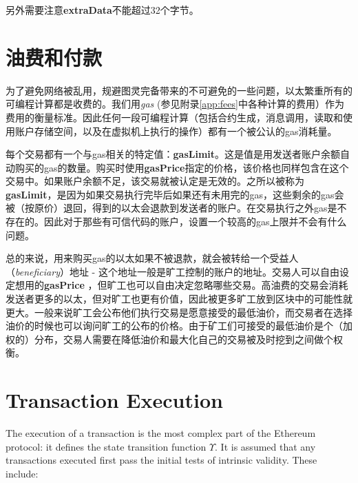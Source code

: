 \documentclass[UTF8,nofonts]{ctexart}
\begin{document}
\begin{multicols}{2}
另外需要注意\textbf{extraData}不能超过32个字节。

\section{油费和付款} \label{ch:payment}

为了避免网络被乱用，规避图灵完备带来的不可避免的一些问题，以太繁重所有的可编程计算都是收费的。我们用\textit{gas} (参见附录\ref{app:fees}中各种计算的费用）作为费用的衡量标准。因此任何一段可编程计算（包括合约生成，消息调用，读取和使用账户存储空间，以及在虚拟机上执行的操作）都有一个被公认的gas消耗量。

每个交易都有一个与gas相关的特定值：\textbf{gasLimit}。这是值是用发送者账户余额自动购买的gas的数量。购买时使用\textbf{gasPrice}指定的价格，该价格也同样包含在这个交易中。如果账户余额不足，该交易就被认定是无效的。之所以被称为\textbf{gasLimit}，是因为如果交易执行完毕后如果还有未用完的gas，这些剩余的gas会被（按原价）退回，得到的以太会退款到发送者的账户。在交易执行之外gas是不存在的。因此对于那些有可信代码的账户，设置一个较高的gas上限并不会有什么问题。

总的来说，用来购买gas的以太如果不被退款，就会被转给一个受益人（\textit{beneficiary}）地址 - 这个地址一般是旷工控制的账户的地址。交易人可以自由设定想用的\textbf{gasPrice} ，但旷工也可以自由决定忽略哪些交易。高油费的交易会消耗发送者更多的以太，但对旷工也更有价值，因此被更多旷工放到区块中的可能性就更大。一般来说旷工会公布他们执行交易是愿意接受的最低油价，而交易者在选择油价的时候也可以询问旷工的公布的价格。由于矿工们可接受的最低油价是个（加权的）分布，交易人需要在降低油价和最大化自己的交易被及时挖到之间做个权衡。



\section{Transaction Execution} \label{ch:transactions}

The execution of a transaction is the most complex part of the Ethereum protocol: it defines the state transition function $\Upsilon$. It is assumed that any transactions executed first pass the initial tests of intrinsic validity. These include:


\end{multicols}
\end{document}
